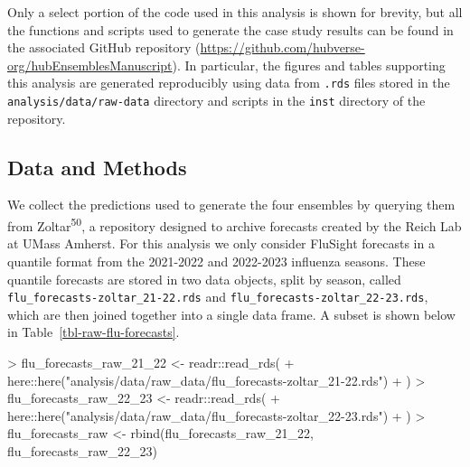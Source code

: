 \documentclass[
  letterpaper,
  DIV=11,
  numbers=noendperiod]{scrartcl}
\newenvironment{Shaded}{\begin{snugshade}}{\end{snugshade}}
\newcommand{\FunctionTok}[1]{\textcolor[rgb]{0.28,0.35,0.67}{#1}}
\newcommand{\NormalTok}[1]{\textcolor[rgb]{0.00,0.23,0.31}{#1}}
\newcommand{\OtherTok}[1]{\textcolor[rgb]{0.00,0.23,0.31}{#1}}
\newcommand{\SpecialCharTok}[1]{\textcolor[rgb]{0.37,0.37,0.37}{#1}}
\newcommand{\StringTok}[1]{\textcolor[rgb]{0.13,0.47,0.30}{#1}}
\begin{document}
Only a select portion of the code used in this analysis is shown for
brevity, but all the functions and scripts used to generate the case
study results can be found in the associated GitHub repository
(\url{https://github.com/hubverse-org/hubEnsemblesManuscript}). In
particular, the figures and tables supporting this analysis are
generated reproducibly using data from \texttt{.rds} files stored in the
\texttt{analysis/data/raw-data} directory and scripts in the
\texttt{inst} directory of the repository.

\subsection{Data and Methods}\label{data-and-methods}

We collect the predictions used to generate the four ensembles by
querying them from Zoltar\textsuperscript{50}, a repository designed to
archive forecasts created by the Reich Lab at UMass Amherst. For this
analysis we only consider FluSight forecasts in a quantile format from
the 2021-2022 and 2022-2023 influenza seasons. These quantile forecasts
are stored in two data objects, split by season, called
\texttt{flu\_forecasts-zoltar\_21-22.rds} and
\texttt{flu\_forecasts-zoltar\_22-23.rds}, which are then joined
together into a single data frame. A subset is shown below in
Table~\ref{tbl-raw-flu-forecasts}.

\begin{Shaded}
\begin{Highlighting}[]
\SpecialCharTok{\textgreater{}}\NormalTok{ flu\_forecasts\_raw\_21\_22 }\OtherTok{\textless{}{-}}\NormalTok{ readr}\SpecialCharTok{::}\FunctionTok{read\_rds}\NormalTok{(}
\SpecialCharTok{+}\NormalTok{   here}\SpecialCharTok{::}\FunctionTok{here}\NormalTok{(}\StringTok{"analysis/data/raw\_data/flu\_forecasts{-}zoltar\_21{-}22.rds"}\NormalTok{)}
\SpecialCharTok{+}\NormalTok{ )}
\SpecialCharTok{\textgreater{}}\NormalTok{ flu\_forecasts\_raw\_22\_23 }\OtherTok{\textless{}{-}}\NormalTok{ readr}\SpecialCharTok{::}\FunctionTok{read\_rds}\NormalTok{(}
\SpecialCharTok{+}\NormalTok{   here}\SpecialCharTok{::}\FunctionTok{here}\NormalTok{(}\StringTok{"analysis/data/raw\_data/flu\_forecasts{-}zoltar\_22{-}23.rds"}\NormalTok{)}
\SpecialCharTok{+}\NormalTok{ )}
\SpecialCharTok{\textgreater{}}\NormalTok{ flu\_forecasts\_raw }\OtherTok{\textless{}{-}} \FunctionTok{rbind}\NormalTok{(flu\_forecasts\_raw\_21\_22, flu\_forecasts\_raw\_22\_23)}
\end{Highlighting}
\end{Shaded}
\end{document}
